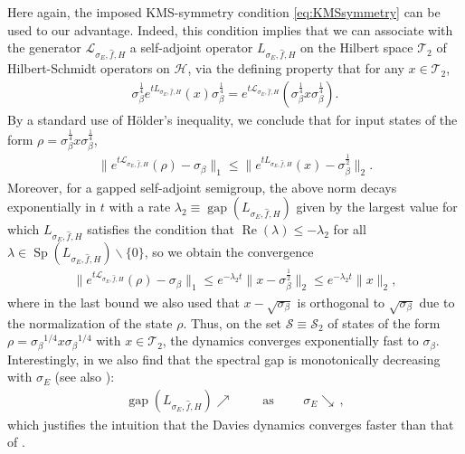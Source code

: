 \documentclass[11pt]{amsart}
\newcommand{\1}{\mathbbm{1}}
\theoremstyle{plain}
\theoremstyle{definition}
\theoremstyle{remark}
\numberwithin{equation}{section}
\begin{document}
Here again, the imposed KMS-symmetry condition \eqref{eq:KMSsymmetry} can be used to our advantage. Indeed, this condition implies that we can associate with the generator $\mathcal{L}_{\sigma_E,\widehat{f},H}$ a self-adjoint operator $L_{\sigma_E,\widehat{f},H}$ on the Hilbert space $\mathscr{T}_2$ of Hilbert-Schmidt operators on $\mathcal{H}$, via the defining property that for any $x\in \mathscr{T}_2$, 
\begin{align*}
\sigma_\beta^{\frac{1}{4}}e^{tL_{\sigma_E,\widehat{f},H}}(x)\sigma_\beta^{\frac{1}{4}}=e^{t\mathcal{L}_{\sigma_E,\widehat{f},H}}(\sigma_\beta^{\frac{1}{4}}x\sigma_\beta^{\frac{1}{4}}).
\end{align*}
By a standard use of H\"{o}lder's inequality, we conclude that for input states of the form $\rho=\sigma_{\beta}^{\frac{1}{4}}x\sigma_\beta^{\frac{1}{4}}$,
\begin{align*}
\big\|e^{t\mathcal{L}_{\sigma_E,\widehat{f},H
}}(\rho)-\sigma_{\beta}\big\|_1\le \|e^{tL_{\sigma_E,\widehat{f},H}}(x)-\sigma_{\beta}^{\frac{1}{2}}\|_2.
\end{align*}
Moreover, for a gapped self-adjoint semigroup, the above norm decays exponentially in $t$ with a rate $\lambda_2\equiv \operatorname{gap}(L_{\sigma_E,\widehat{f},H})$ given by the largest value for which $L_{\sigma_E,\widehat{f},H}$ satisfies the condition that $\operatorname{Re}(\lambda)\le -\lambda_2$ for all $\lambda\in \operatorname{Sp}(L_{\sigma_E,\widehat{f},H})\backslash \{0\}$, so we obtain the convergence
\begin{align*}
\big\|e^{t\mathcal{L}_{\sigma_E,\widehat{f},H}}(\rho)-\sigma_{\beta}\big\|_1\!\le\! e^{-\lambda_2t}\|x-\sigma_\beta^{\frac{1}{2}}\|_2\le e^{-\lambda_2 t}\|x\|_2,
\end{align*}
where in the last bound we also used that $x-\sqrt{\sigma_\beta}$ is orthogonal to $\sqrt{\sigma_\beta}$ due to the normalization of the state $\rho$. Thus, on the set $\mathscr{S}\equiv \mathscr{S}_2$ of states of the form $\rho={\sigma_\beta}^{1/4}x{\sigma_\beta}^{1/4}$ with $x\in \mathscr{T}_2$, the dynamics converges exponentially fast to $\sigma_\beta$. Interestingly, in  we also find that the spectral gap is monotonically decreasing with $\sigma_E$ (see also \cite{slezak2026polynomial}):
\begin{align*}
\operatorname{gap}(L_{\sigma_E,\widehat{f},H})\nearrow\qquad 
\text{ as } \qquad \sigma_E\searrow \,,
\end{align*}
which justifies the intuition that the Davies dynamics converges faster than that of \cite{ding2025efficient}.
\end{document}
